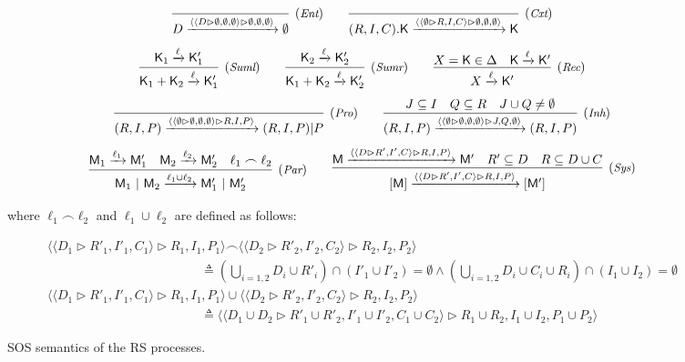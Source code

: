 \documentclass[sn-mathphys-num,a4paper,iicol,lineno,pdflatex]{sn-jnl-hacked}
\newcommand{\obs}[2]{\langle #1\vartriangleright #2\rangle}
\theoremstyle{thmstyleone}%
\theoremstyle{thmstyletwo}%
\theoremstyle{thmstylethree}%
\begin{document}
\begin{figure}[t]
		$$  
		\infer[(\textit{\scriptsize{Ent}})]
		{D \xrightarrow{\obs{\obs{D}{\emptyset,\emptyset,\emptyset}}{\emptyset,\emptyset,\emptyset}}\emptyset}
		{}
		\qquad
		\infer[(\textit{\scriptsize{Cxt}})]
		{(R,I,C).\mathsf{K} \xrightarrow{\obs{\obs{\emptyset}{R,I,C}}{\emptyset,\emptyset,\emptyset}}\mathsf{K}}{}
		$$
		$$
		\infer[(\textit{\scriptsize Suml})]
		{\mathsf{K}_1 + \mathsf{K}_2 \xrightarrow{\ell}\mathsf{K}'_1}
		{\mathsf{K}_1 \xrightarrow{\ell}\mathsf{K}'_1}
		\qquad
		\infer[(\textit{\scriptsize Sumr})]
		{\mathsf{K}_1 + \mathsf{K}_2 \xrightarrow{\ell}\mathsf{K}'_2}
		{\mathsf{K}_2 \xrightarrow{\ell}\mathsf{K}'_2}
		\qquad
		\infer[(\textit{\scriptsize Rec})]
		{X \xrightarrow{\ell}\mathsf{K}'}
		{X=\mathsf{K}\in\Delta & \mathsf{K} \xrightarrow{\ell}\mathsf{K}'}
		$$
		$$
		\infer[(\textit{\scriptsize Pro})]
		{(R,I,P)  \xrightarrow{\obs{\obs{\emptyset}{\emptyset,\emptyset,\emptyset}}{R,I,P}}(R,I,P)|P}
		{}
		\qquad
		\infer[(\textit{\scriptsize Inh})]
		{(R,I,P)  \xrightarrow{\obs{\obs{\emptyset}{\emptyset,\emptyset,\emptyset}}{J,Q,\emptyset}}(R,I,P)}
		{J \subseteq I & Q \subseteq R & J\cup Q\neq \emptyset}
		$$
		$$
		\infer[(\textit{\scriptsize Par})]
		{\mathsf{M}_1~|~\mathsf{M}_2\xrightarrow{\ell_1\cup\ell_2} \mathsf{M}'_1~|~\mathsf{M}'_2}
		{\mathsf{M}_1 \xrightarrow{\ell_1} \mathsf{M}'_1 &
		\mathsf{M}_2 \xrightarrow{\ell_2} \mathsf{M}'_2 &
			\ell_1\frown \ell_2 }
		\qquad
		\infer[(\textit{\scriptsize Sys})]
		{[\mathsf{M}]\xrightarrow{\obs{\obs{D}{R',I',C}}{R,I,P}} [\mathsf{M}']}
		{\mathsf{M}\xrightarrow{\obs{\obs{D}{R',I',C}}{R,I,P}} \mathsf{M}' &
		R'\subseteq D &
        R\subseteq D\cup C}
		$$
		
\noindent
		where $\ell_1 \frown \ell_2$ and $\ell_1 \cup \ell_2$ are defined as follows:
		
		$$\begin{array}{l}
\obs{\obs{D_1}{R'_1,I'_1,C_1}}{R_1,I_1,P_1}
\frown
\obs{\obs{D_2}{R'_2,I'_2,C_2}}{R_2,I_2,P_2}
\\
\qquad\qquad\qquad\qquad\qquad\qquad
\triangleq (\textstyle\bigcup_{i=1,2} D_i\cup  R'_i) \cap (I'_1 \cup I'_2) = \emptyset
\wedge
(\bigcup_{i=1,2} D_i\cup  C_i\cup  R_i) \cap (I_1 \cup I_2) = \emptyset \\[5pt]
\obs{\obs{D_1}{R'_1,I'_1,C_1}}{R_1,I_1,P_1}
\cup
\obs{\obs{D_2}{R'_2,I'_2,C_2}}{R_2,I_2,P_2}
\\
\qquad\qquad\qquad\qquad\qquad\qquad
\triangleq \obs{\obs{D_1\cup D_2}{R'_1\cup R'_2,I'_1\cup I'_2,C_1\cup C_2}}{R_1\cup R_2,I_1\cup I_2,P_1\cup P_2}
\end{array}$$
		\caption{SOS semantics of the RS processes.}
		\label{fig:guardforRS2nd}
\end{figure}
\end{document}
